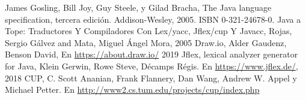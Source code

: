\documentclass[12pt,a4paper]{article}
\begin{document}



\clearpage	
	\begin{thebibliography}{99}	
		 James Gosling, Bill Joy, Guy Steele, y Gilad Bracha, The Java language specification, tercera edición. Addison-Wesley, 2005. ISBN 0-321-24678-0.
		 Java a Tope: Traductores Y Compiladores Con Lex/yacc, Jflex/cup Y Javacc, Rojas, Sergio G{\'a}lvez and Mata, Miguel {\'A}ngel Mora, 2005
		 Draw.io, Alder Gaudenz, Benson David, En \url{https://about.draw.io/} 2019
		 Jflex, lexical analyzer generator for Java, Klein Gerwin, Rowe Steve, Décamps Régis. En \url{https://www.jflex.de/}, 2018
		 CUP, C. Scott Ananian, Frank Flannery, Dan Wang, Andrew W. Appel y Michael Petter. En \url{http://www2.cs.tum.edu/projects/cup/index.php}
			
		
		
	
	\end{thebibliography}	
	
\end{document}
